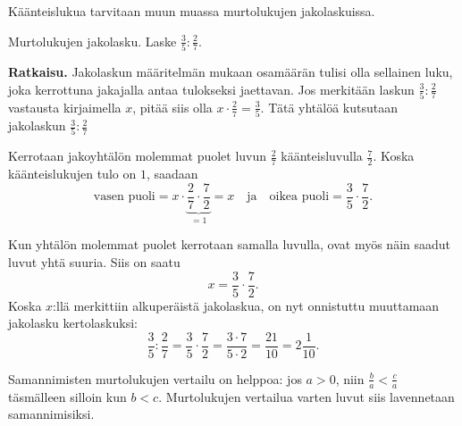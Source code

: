Käänteislukua tarvitaan muun muassa murtolukujen jakolaskuissa.
 
\begin{esimerkki}
Murtolukujen jakolasku. Laske $\frac 3 5 : \frac 2 7$.

\textbf{Ratkaisu.}
Jakolaskun määritelmän mukaan osamäärän tulisi olla sellainen luku, joka kerrottuna jakajalla antaa tulokseksi jaettavan. 
Jos merkitään laskun $\frac 3 5 : \frac 2 7$ vastausta kirjaimella $x$, pitää siis olla $x \cdot \frac 2 7 = \frac 3 5$.  
Tätä yhtälöä kutsutaan jakolaskun $\frac 3 5 : \frac 2 7$ 

Kerrotaan jakoyhtälön molemmat puolet luvun $\frac 2 7$ käänteisluvulla $\frac 7 2$. Koska käänteislukujen tulo on $1$, saadaan
\[
	\text{vasen puoli} = x \cdot \underbrace{\frac 2 7 \cdot \frac 7 2}_{= 1} = x \quad \text{ja} \quad \text{oikea puoli} = \frac 3 5 \cdot \frac 7 2.
\]

Kun yhtälön molemmat puolet kerrotaan samalla luvulla, ovat myös näin saadut luvut yhtä suuria. Siis on saatu
\[
	x = \frac 3 5 \cdot \frac 7 2.
\]
Koska $x$:llä merkittiin alkuperäistä jakolaskua, on nyt onnistuttu muuttamaan jakolasku kertolaskuksi:
\[
	\frac 3 5 : \frac 2 7 = \frac 3 5 \cdot \frac 7 2 = \frac{3 \cdot 7}{5 \cdot 2} = \frac{21}{10} = 2 \frac{1}{10}.
\]
 \end{esimerkki}
 

Samannimisten murtolukujen vertailu on helppoa: jos $a>0$, niin $\frac{b}{a} < \frac{c}{a}$ täsmälleen silloin kun $b < c$. Murtolukujen vertailua varten luvut siis lavennetaan samannimisiksi.

    
    
